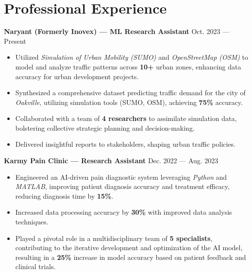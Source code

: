 \documentclass[a4paper, 12pt]{article}
\begin{document}
\section{Professional Experience}

\textcolor{imptextblack}{\textbf{Naryant (Formerly Inovex) --- ML Research Assistant}} \hfill Oct. 2023 --- Present
\begin{itemize}[nosep, after=\strut, itemsep=2pt]
    \item Utilized \textcolor{imptextblack}{\textit{Simulation of Urban Mobility (SUMO)}}
          and \textcolor{imptextblack}{\textit{OpenStreetMap (OSM)}} to model and analyze
          traffic patterns across \textcolor{imptextblack}{\textbf{10+}} urban zones,
          enhancing data accuracy for urban development projects.
    \item Synthesized a comprehensive dataset predicting traffic demand for the city of
          \textcolor{imptextblack}{\textit{Oakville}}, utilizing simulation tools (SUMO,
          OSM), achieving \textcolor{imptextblack}{\textbf{75\%}} accuracy.
    \item Collaborated with a team of \textcolor{imptextblack}{\textbf{4 researchers}} to
          assimilate simulation data, bolstering collective strategic planning and
          decision-making.
    \item Delivered insightful reports to stakeholders, shaping urban traffic policies.
\end{itemize}

\textcolor{imptextblack}{\textbf{Karmy Pain Clinic --- Research Assistant}} \hfill Dec. 2022 --- Aug. 2023
\begin{itemize}[nosep, after=\strut, itemsep=2pt]
    \item Engineered an AI-driven pain diagnostic system leveraging
          \textcolor{imptextblack}{\textit{Python}} and
          \textcolor{imptextblack}{\textit{MATLAB}}, improving patient diagnosis accuracy
          and treatment efficacy, reducing diagnosis time by
          \textcolor{imptextblack}{\textbf{15\%}}.
    \item Increased data processing accuracy by \textcolor{imptextblack}{\textbf{30\%}}
          with improved data analysis techniques.
    \item Played a pivotal role in a multidisciplinary team of
          \textcolor{imptextblack}{\textbf{5 specialists}}, contributing to the iterative
          development and optimization of the AI model, resulting in a
          \textcolor{imptextblack}{\textbf{25\%}} increase in model accuracy based on
          patient feedback and clinical trials.
\end{itemize}
\end{document}
